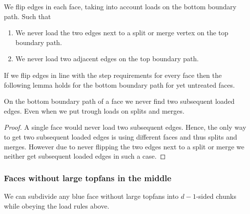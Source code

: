   We flip edges in each face, taking into account loads on the bottom boundary path. Such that

  \begin{enumerate}
    \item We never load the two edges next to a split or merge vertex on the top boundary path.
    \item We never load two adjacent edges on the top boundary path.
  \end{enumerate}

  If we flip edges in line with the step requirements for every face then the following lemma holds for the bottom boundary path for yet untreated faces.

  \begin{lemma}
    \label{lm:}
    On the bottom boundary path of a face we never find two subsequent loaded edges. Even when we put trough loads on splits and merges.
  \end{lemma}
  \begin{proof}
    A single face would never load two subsequent edges. Hence, the only way to get two subsequent loaded edges is using different faces and thus splits and merges.
    However due to never flipping the two edges next to a split or merge we neither get subsequent loaded edges in such a case.
  \end{proof}


\subsubsection{Faces without large topfans in the middle}
  \begin{lemma}
    \label{lm:subdiv:withoutTopfan}
    We can subdivide any blue face without large topfans into $d-1$-sided chunks while obeying the load rules above.
  \end{lemma}

